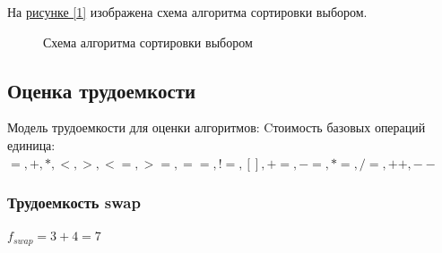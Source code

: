 \documentclass{article}
\begin{document}
	\newpage
	На \hyperref[choose]{рисунке  [\ref{choose}]} изображена схема алгоритма сортировки выбором.
	\begin{figure}[h!]
		\caption{Схема алгоритма сортировки выбором}
		\label{choose}
	\end{figure}
	\newpage
		 \subsection{Оценка трудоемкости}
		Модель трудоемкости для оценки алгоритмов:
		\newline
		Cтоимость базовых операций единица:
		\newline
		$=,+,*,<,>,<=,>=,==,!=,[],+=,-=,*=,/=,++,--$
		\newline
		\indent 
		\subsubsection{Трудоемкость swap}
	     $f_{swap} = 3 + 4 = 7$
\end{document}
